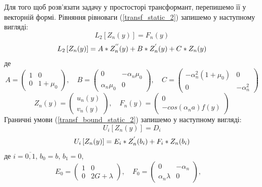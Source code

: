 Для того щоб розв'язати задачу у простосторі трансформант, перепишемо її у векторній формі.
Рівняння рівноваги (\ref{transf_static_2}) запишемо у наступному вигляді:
\begin{equation}\label{transf_mat_static_2}
    L_2\left[ Z_n(y) \right] = F_n(y)
\end{equation}
\begin{equation}
    L_2\left[ Z_n(y) \right] = A * Z_n^{''}(y) + B * Z_n^{'}(y) + C * Z_n(y) \nonumber \\
\end{equation}
де
\begin{equation*}
    A = \begin{pmatrix}
        1 & 0 \\
        0 & 1 + \mu_0
    \end{pmatrix}, \quad
    B = \begin{pmatrix}
        0 & -\alpha_n \mu_0 \\
        \alpha_n \mu_0 & 0
    \end{pmatrix}, \quad
    C = \begin{pmatrix}
        -\alpha_n^2(1 + \mu_0) & 0 \\
        0 & -\alpha_n^2
    \end{pmatrix}
\end{equation*}
\begin{equation*}
    Z_n(y) = \begin{pmatrix}
        u_n(y) \\
        v_n(y)
    \end{pmatrix}, \quad 
    F_n(y) = \begin{pmatrix}
        0 \\
        - cos(\alpha_n a) f(y)
    \end{pmatrix}
\end{equation*}
Граничні умови (\ref{transf_bound_static_2}) запишемо у наступному вигляді:
\begin{equation}\label{transf_bound_mat_static_2}
    U_i\left[ Z_n(y) \right] = D_i
\end{equation}
\begin{equation}
    U_i\left[ Z_n(y) \right] = E_i * Z_n^{'}(b_i) + F_i * Z_n(b_i) \nonumber \\
\end{equation}
де $i = \overline{0, 1}$, $b_0 = b$, $b_1 = 0$,
\begin{equation*}
    E_0 = \begin{pmatrix}
        1 & 0 \\
        0 & 2G + \lambda
    \end{pmatrix}, \quad
    F_0 = \begin{pmatrix}
        0 & -\alpha_n \\
        \alpha_n \lambda & 0
    \end{pmatrix}, \quad
\end{equation*}
